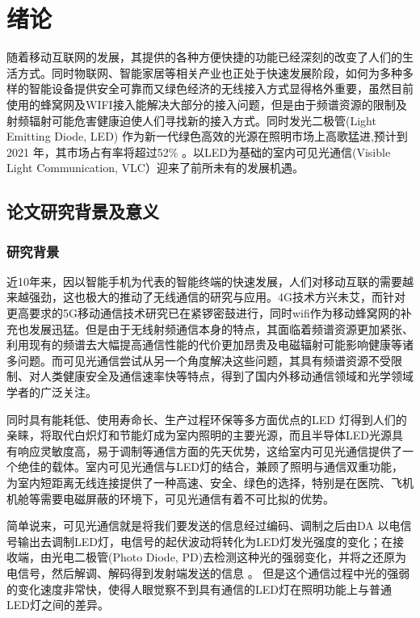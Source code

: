 
\chapter{绪论}\label{chap:introduction}
随着移动互联网的发展，其提供的各种方便快捷的功能已经深刻的改变了人们的生活方式。同时物联网、智能家居等相关产业也正处于快速发展阶段，如何为多种多样的智能设备提供安全可靠而又绿色经济的无线接入方式显得格外重要，虽然目前使用的蜂窝网及WIFI接入能解决大部分的接入问题，但是由于频谱资源的限制及射频辐射可能危害健康迫使人们寻找新的接入方式。同时发光二极管(Light Emitting Diode, LED) 作为新一代绿色高效的光源在照明市场上高歌猛进,预计到2021 年，其市场占有率将超过52\%
\cite{陈特2013可见光通信的研究}。以LED为基础的室内可见光通信(Visible Light Communication, VLC）迎来了前所未有的发展机遇。

\section{论文研究背景及意义}\label{sec:background}
\subsection{研究背景}
近10年来，因以智能手机为代表的智能终端的快速发展，人们对移动互联的需要越来越强劲，这也极大的推动了无线通信的研究与应用。4G技术方兴未艾，而针对更高要求的5G移动通信技术研究已在紧锣密鼓进行，同时wifi作为移动蜂窝网的补充也发展迅猛。但是由于无线射频通信本身的特点，其面临着频谱资源更加紧张、利用现有的频谱去大幅提高通信性能的代价更加昂贵及电磁辐射可能影响健康等诸多问题。而可见光通信尝试从另一个角度解决这些问题，其具有频谱资源不受限制、对人类健康安全及通信速率快等特点，得到了国内外移动通信领域和光学领域学者的广泛关注。

同时具有能耗低、使用寿命长、生产过程环保等多方面优点的LED 灯得到人们的亲睐，将取代白炽灯和节能灯成为室内照明的主要光源，而且半导体LED光源具有响应灵敏度高，易于调制等通信方面的先天优势，这给室内可见光通信提供了一个绝佳的载体。室内可见光通信与LED灯的结合，兼顾了照明与通信双重功能，为室内短距离无线连接提供了一种高速、安全、绿色的选择，特别是在医院、飞机机舱等需要电磁屏蔽的环境下，可见光通信有着不可比拟的优势。

简单说来，可见光通信就是将我们要发送的信息经过编码、调制之后由DA 以电信号输出去调制LED灯，电信号的起伏波动将转化为LED灯发光强度的变化；在接收端，由光电二极管(Photo Diode, PD)去检测这种光的强弱变化，并将之还原为电信号，然后解调、解码得到发射端发送的信息
\cite{tanaka2001indoor,fan2002effect,komine2003integrated,komine2004fundamental}。 但是这个通信过程中光的强弱的变化速度非常快，使得人眼觉察不到具有通信的LED灯在照明功能上与普通LED灯之间的差异。

